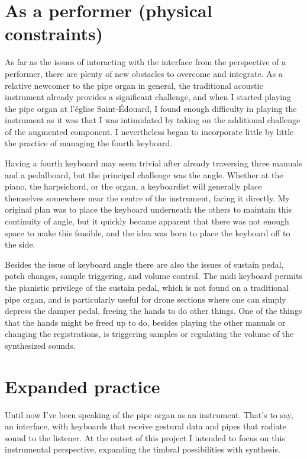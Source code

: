 \documentclass[12pt,twoside,maitrise]{dms_ks}
\theoremstyle{definition}
\begin{document}
\section{As a performer (physical constraints)}

As far as the issues of interacting with the interface from the perspective of a performer, there are plenty of new obstacles to overcome and integrate. 
As a relative newcomer to the pipe organ in general, the traditional acoustic instrument already provides a significant challenge, and when I started playing the pipe organ at l’église Saint-Édouard, I found enough difficulty in playing the instrument as it was that I was intimidated by taking on the additional challenge of the augmented component. 
I nevertheless began to incorporate little by little the practice of managing the fourth keyboard. 

Having a fourth keyboard may seem trivial after already traversing three manuals and a pedalboard, but the principal challenge was the angle. 
Whether at the piano, the harpsichord, or the organ, a keyboardist will generally place themselves somewhere near the centre of the instrument, facing it directly. 
My original plan was to place the keyboard underneath the others to maintain this continuity of angle, but it quickly became apparent that there was not enough space to make this feasible, and the idea was born to place the keyboard off to the side. 

Besides the issue of keyboard angle there are also the issues of sustain pedal, patch changes, sample triggering, and volume control. 
The midi keyboard permits the pianistic privilege of the sustain pedal, which is not found on a traditional pipe organ, and is particularly useful for drone sections where one can simply depress the damper pedal, freeing the hands to do other things. 
One of the things that the hands might be freed up to do, besides playing the other manuals or changing the registrations, is triggering samples or regulating the volume of the synthesized sounds. 

\section{Expanded practice}

Until now I've been speaking of the pipe organ as an instrument. 
That's to say, an interface, with keyboards that receive gestural data and pipes that radiate sound to the listener. 
At the outset of this project I intended to focus on this instrumental perspective, expanding the timbral possibilities with synthesis.
\end{document}

